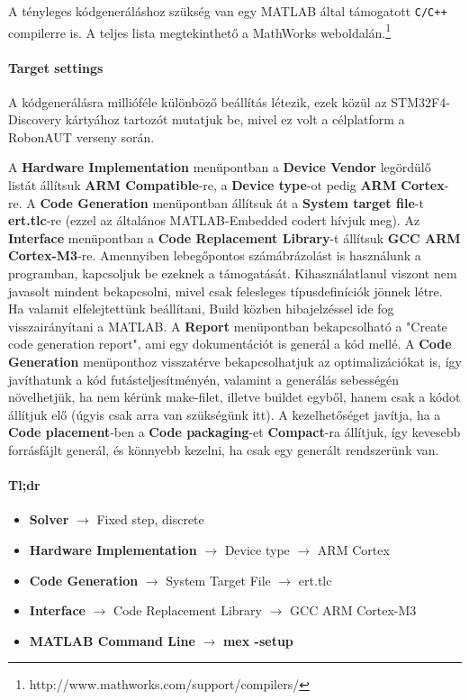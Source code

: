 A tényleges kódgeneráláshoz szükség van egy MATLAB által támogatott \verb!C/C++! compilerre is. A teljes lista megtekinthető a MathWorks weboldalán.\footnote{http://www.mathworks.com/support/compilers/}

\paragraph{Target settings}

A kódgenerálásra millióféle különböző beállítás létezik, ezek közül az STM32F4-Discovery kártyához tartozót mutatjuk be, mivel ez volt a célplatform a RobonAUT verseny során.

A \textbf{Hardware Implementation} menüpontban a \textbf{Device Vendor} legördülő listát állítsuk \textbf{ARM Compatible}-re, a \textbf{Device type}-ot pedig \textbf{ARM Cortex}-re.
A \textbf{Code Generation} menüpontban állítsuk át a \textbf{System target file}-t \textbf{ert.tlc}-re (ezzel az általános MATLAB-Embedded codert hívjuk meg).
Az \textbf{Interface} menüpontban a \textbf{Code Replacement Library}-t állítsuk \textbf{GCC ARM Cortex-M3}-re.
Amennyiben lebegőpontos számábrázolást is használunk a programban, kapcsoljuk be ezeknek a támogatását. Kihasználatlanul viszont nem javasolt mindent bekapcsolni, mivel csak felesleges típusdefiníciók jönnek létre. Ha valamit elfelejtettünk beállítani, Build közben hibajelzéssel ide fog visszairányítani a MATLAB.
A \textbf{Report} menüpontban bekapcsolható a "Create code generation report", ami egy dokumentációt is generál a kód mellé.
A \textbf{Code Generation} menüponthoz visszatérve bekapcsolhatjuk az optimalizációkat is, így javíthatunk a kód futásteljesítményén, valamint a generálás sebességén növelhetjük, ha nem kérünk make-filet, illetve buildet egyből, hanem csak a kódot állítjuk elő (úgyis csak arra van szükségünk itt).
A kezelhetőséget javítja, ha a \textbf{Code placement}-ben a \textbf{Code packaging}-et \textbf{Compact}-ra állítjuk, így kevesebb forrásfájlt generál, és könnyebb kezelni, ha csak egy generált rendszerünk van.

\paragraph{Tl;dr}

\begin{itemize}

    \item \textbf{Solver} $\rightarrow$ Fixed step, discrete
    \item \textbf{Hardware Implementation} $\rightarrow$ Device type $\rightarrow$ ARM Cortex
    \item \textbf{Code Generation} $\rightarrow$ System Target File $\rightarrow$ ert.tlc
    \item \textbf{Interface} $\rightarrow$ Code Replacement Library $\rightarrow$ GCC ARM Cortex-M3
    \item \textbf{MATLAB Command Line} $\rightarrow$ \textbf{mex -setup}

\end{itemize}

